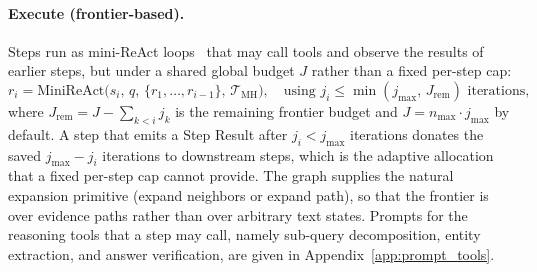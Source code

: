 \documentclass[11pt,a4paper]{article}
\begin{document}
\paragraph{Execute (frontier-based).}
Steps run as mini-ReAct loops~\citep{yao2023react} that may call tools and observe the results of earlier steps, but under a shared global budget $J$ rather than a fixed per-step cap:
\begin{equation}
r_{i}=\mathrm{MiniReAct}\!\bigl(s_{i},\,q,\,\{r_{1},\dots,r_{i-1}\},\,\mathcal{T}_{\mathrm{MH}}\bigr),\quad \text{using } j_i\le\min(j_{\max},\,J_{\text{rem}})\text{ iterations,}
\label{eq:exec}
\end{equation}
where $J_{\text{rem}}=J-\sum_{k<i}j_k$ is the remaining frontier budget and $J{=}n_{\max}{\cdot}j_{\max}$ by default.
A step that emits a Step Result after $j_i<j_{\max}$ iterations donates the saved $j_{\max}-j_i$ iterations to downstream steps, which is the adaptive allocation that a fixed per-step cap cannot provide.
The graph supplies the natural expansion primitive (expand neighbors or expand path), so that the frontier is over evidence paths rather than over arbitrary text states.
Prompts for the reasoning tools that a step may call, namely sub-query decomposition, entity extraction, and answer verification, are given in Appendix~\ref{app:prompt_tools}.
\end{document}
